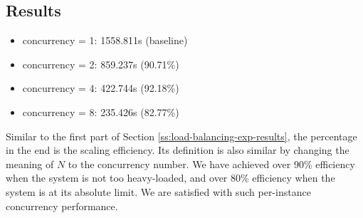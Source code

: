 \subsection{Results}

\begin{itemize}
    \item concurrency = 1: 1558.811s (baseline)
    \item concurrency = 2: 859.237s (90.71\%)
    \item concurrency = 4: 422.744s (92.18\%)
    \item concurrency = 8: 235.426s (82.77\%)
\end{itemize}

Similar to the first part of Section \ref{ss:load-balancing-exp-results}, the percentage in the end is the scaling efficiency. Its definition is also similar by changing the meaning of $N$ to the concurrency number. We have achieved over 90\% efficiency when the system is not too heavy-loaded, and over 80\% efficiency when the system is at its absolute limit. We are satisfied with such per-instance concurrency performance.
